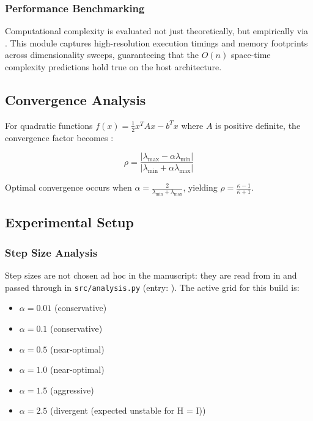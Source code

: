 \documentclass[
]{article}
\providecommand{\tightlist}{%
  \setlength{\itemsep}{0pt}\setlength{\parskip}{0pt}}
\begin{document}
\subsubsection{Performance Benchmarking}\label{performance-benchmarking}

Computational complexity is evaluated not just theoretically, but
empirically via
\href{https://github.com/docxology/template/blob/main/infrastructure/scientific/benchmarking.py}{}.
This module captures high-resolution execution timings and memory
footprints across dimensionality sweeps, guaranteeing that the \(O(n)\)
space-time complexity predictions hold true on the host architecture.

\subsection{Convergence Analysis}\label{convergence-analysis}

For quadratic functions \(f(x) = \frac{1}{2}x^T A x - b^T x\) where
\(A\) is positive definite, the convergence factor becomes
\citep{bertsekas1999nonlinear}:

\begin{equation}
\label{eq:convergence_factor}
\rho = \frac{|\lambda_{\max} - \alpha\lambda_{\min}|}{|\lambda_{\min} + \alpha\lambda_{\max}|}
\end{equation}

Optimal convergence occurs when
\(\alpha = \frac{2}{\lambda_{\min} + \lambda_{\max}}\), yielding
\(\rho = \frac{\kappa - 1}{\kappa + 1}\).

\subsection{Experimental Setup}\label{experimental-setup}

\subsubsection{Step Size Analysis}\label{step-size-analysis}

Step sizes are not chosen ad hoc in the manuscript: they are read from
 in  and
passed through  in
\texttt{src/analysis.py} (entry:
). The active grid for this
build is:

\begin{itemize}
\tightlist
\item
  \(\alpha = 0.01\) (conservative)
\item
  \(\alpha = 0.1\) (conservative)
\item
  \(\alpha = 0.5\) (near-optimal)
\item
  \(\alpha = 1.0\) (near-optimal)
\item
  \(\alpha = 1.5\) (aggressive)
\item
  \(\alpha = 2.5\) (divergent (expected unstable for H = I))
\end{itemize}
\end{document}
